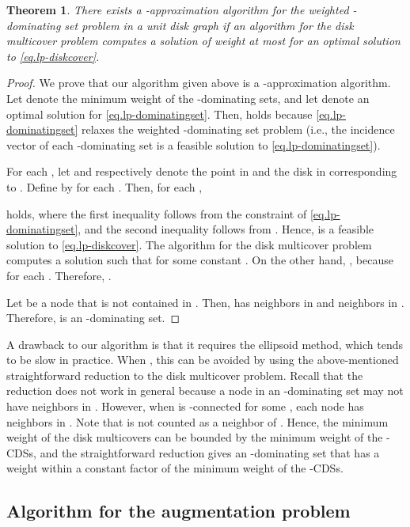 \documentclass[11pt]{article}
\newtheorem{theorem}{Theorem}
\begin{document}
\begin{theorem}
 There exists a -approximation algorithm for the weighted -dominating set problem in a
 unit disk graph if an algorithm for the disk multicover problem
 computes a solution of weight at most
  for an optimal solution  to
 \eqref{eq.lp-diskcover}.
\end{theorem}
\begin{proof}
 We prove that our algorithm given above is a -approximation algorithm.
 Let  denote the minimum weight of the -dominating sets,
 and let  denote an optimal solution for \eqref{eq.lp-dominatingset}. Then,
  holds
 because
 \eqref{eq.lp-dominatingset} relaxes 
  the weighted -dominating set problem 
 (i.e., the incidence vector of each -dominating set is a feasible solution to
 \eqref{eq.lp-dominatingset}).

For each , let  and  respectively denote the point in  and the
 disk in  corresponding to .
 Define  by  for each .
 Then, for each ,
 
 holds, where the first inequality follows from the constraint
 of \eqref{eq.lp-dominatingset}, and the second inequality follows from
 .
Hence,  is a feasible solution to \eqref{eq.lp-diskcover}.
 The algorithm for the disk multicover problem computes a solution  such that  for some constant .
 On the other hand, , because  for
 each .
 Therefore, .

 Let  be a node that is not contained in .
 Then,  has  neighbors in 
 and  neighbors in .
 Therefore,  is an -dominating set.
 \end{proof}

 A drawback to our algorithm is that it requires the ellipsoid method,
 which tends to be slow in practice.
 When ,
 this can be avoided by using the above-mentioned straightforward reduction to the disk multicover problem.
 Recall that the reduction does not work in general
 because
 a node in an -dominating set  may not have  neighbors in .
 However, when  is -connected for some ,
 each node  has  neighbors in . Note that  is not
 counted as a neighbor of .
 Hence, the minimum weight of the disk multicovers can be bounded by the
 minimum weight of the -CDSs,
 and the straightforward reduction gives an -dominating set
 that has a weight within a constant factor of the minimum weight of
 the -CDSs.


 \subsection{Algorithm for the augmentation problem}
 \label{ssec.augmentation}
 
\end{document}
